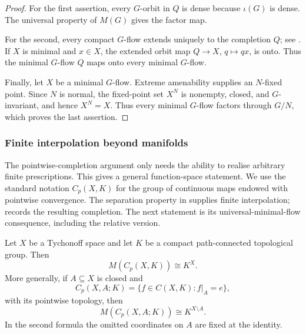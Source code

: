 \begin{proof}
For the first assertion, every \(G\)-orbit in \(Q\) is dense because
\(\iota(G)\) is dense. The universal property of \(M(G)\) gives the factor
map.

For the second, every compact \(G\)-flow extends uniquely to the completion
\(Q\); see \cite[Fact~2.3]{BassoZucker2021}. If \(X\) is minimal and \(x\in X\), the
extended orbit map \(Q\to X\), \(q\mapsto qx\), is onto. Thus the minimal
\(G\)-flow \(Q\) maps onto every minimal \(G\)-flow.

Finally, let \(X\) be a minimal \(G\)-flow. Extreme amenability supplies an
\(N\)-fixed point. Since \(N\) is normal, the fixed-point set \(X^N\) is
nonempty, closed, and \(G\)-invariant, and hence \(X^N=X\). Thus every
minimal \(G\)-flow factors through \(G/N\), which proves the last assertion.
\end{proof}


\subsubsection{Finite interpolation beyond manifolds}

The pointwise-completion argument only needs the ability to realise arbitrary
finite prescriptions.  This gives a general function-space statement.  We use
the standard notation \(C_p(X,K)\) for the group of continuous maps endowed
with pointwise convergence. The separation property in
\cite[Definition~2.1 and Remark~2.2]{HernandezRodenas2007} supplies finite interpolation;
\cite[Definition~2.2(iii), Proposition~2.3(i), and proof of Theorem~3.3,
equation~(10)]{ShakhmatovSpevak2010} records the resulting completion. The next statement is
its universal-minimal-flow consequence, including the relative version.

\begin{theorem}\label{thm:pw-cp-umf}
Let \(X\) be a Tychonoff space and let \(K\) be a compact path-connected
topological group. Then
\[
M(C_p(X,K))\cong K^X.
\]
More generally, if \(A\subseteq X\) is closed and
\[
C_p(X,A;K)=\{f\in C(X,K):f|_A=e\},
\]
with its pointwise topology, then
\[
M(C_p(X,A;K))\cong K^{X\setminus A}.
\]
In the second formula the omitted coordinates on \(A\) are fixed at the
identity.
\end{theorem}


